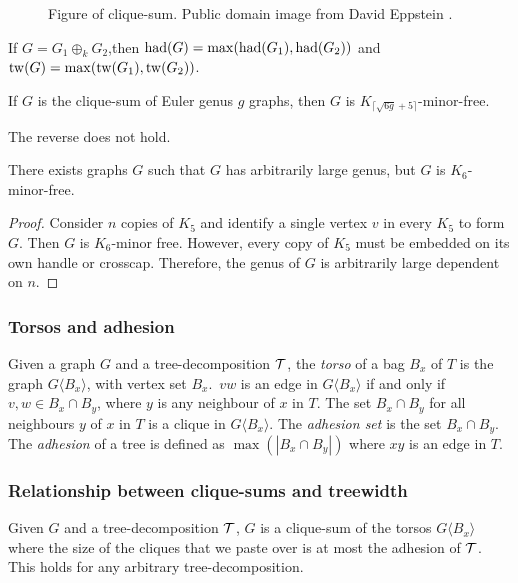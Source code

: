 \begin{figure}[h]
	\centering
	
	\caption{Figure of clique-sum. Public domain image from David Eppstein \cite{eppsteinCliquesum2023}.}
	\label{fig:clique-sum}
\end{figure}


\begin{lemma}
	If \(G = G_1 \oplus_k G_2\),then \(\operatorname{had}(G) = \max(\operatorname{had}(G_1), \operatorname{had}(G_2))\) and \(\operatorname{tw}(G) = \max(\operatorname{tw}(G_1), \operatorname{tw}(G_2))\).
\end{lemma}

\begin{corollary}\label{corr:clique_sum_genus}
	If \(G\) is the clique-sum of Euler genus \(g\) graphs, then \(G\) is \(K_{\lceil \sqrt{6g} + 5 \rceil}\)-minor-free.
\end{corollary}
The reverse does not hold. 
\begin{lemma}
	There exists graphs $G$ such that \(G\) has arbitrarily large genus, but $G$ is \(K_{6}\)-minor-free.
\end{lemma}

\begin{proof}
	Consider $n$ copies of $K_5$ and identify a single vertex $v$ in every $K_5$ to form $G$. Then $G$ is $K_6$-minor free. However, every copy of $K_5$ must be embedded on its own handle or crosscap. Therefore, the genus of $G$ is arbitrarily large dependent on $n$. 
\end{proof}

\subsubsection{Torsos and adhesion}\label{sssec:Torsos and Adhesion}
Given a graph \(G\) and a tree-decomposition \(\mathcal{T}\), the \textit{torso} of a bag \(B_x\) of \(T\) is the graph \(G\langle B_x \rangle\), with vertex set $B_x$.\ \(vw\) is an edge in \(G\langle B_x \rangle\) if and only if \(v,w \in B_x \cap B_y\), where \(y\) is any neighbour of \(x\) in \(T\). The set \(B_x \cap B_y\) for all neighbours \(y\) of \(x\) in \(T\) is a clique in \(G\langle B_x \rangle\).
The \textit{adhesion set} is the set \(B_x \cap B_y\). 
The \textit{adhesion} of a tree is defined as \(\max(|B_x \cap B_y|)\) where \(xy\) is an edge in \(T\).

\subsubsection{Relationship between clique-sums and treewidth}
Given \(G\) and a tree-decomposition \(\mathcal{T}\), \(G\) is a clique-sum of the torsos \(G\langle B_x \rangle\) where the size of the cliques that we paste over is at most the adhesion of $\mathcal{T}$. This holds for any arbitrary tree-decomposition.

